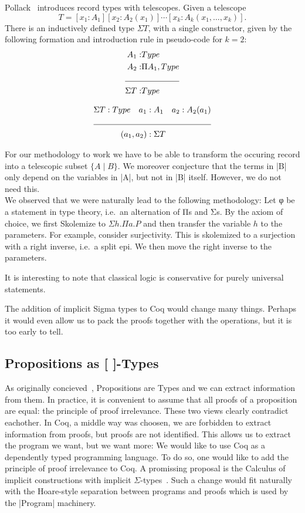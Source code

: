 \documentclass[a4paper,10pt,runningheads]{llncs}
\begin{document}
Pollack~\cite{pollack2000dependently} introduces record types with telescopes. 
Given a telescope\[
T=[x_1:A_1][x_2:A_2(x_1)]\cdots[x_k:A_k(x_1,\ldots,x_k)].
\]
There is an inductively defined type $\Sigma T$, with a single constructor, given by the following 
formation and introduction rule in pseudo-code for $k=2$:
\begin{align*}
 A_1 :& Type\\
 A_2 :& \Pi A_1,Type\\
\cline{1-2}
\Sigma T :& Type
\end{align*}

\begin{align*}
 \Sigma T:Type\quad a_1 &:A_1 \quad a_2 : A_2(a_1)\\
\cline{1-3}
(a_1,a_2) &:\Sigma T
\end{align*}

For our methodology to work we have to be able to transform the occuring record into a telescopic
subset $\{ A \mid  B\}$. We moreover conjecture that the terms in |B| only depend on the
variables in |A|, but not in |B| itself. However, we do not need this.\\

We observed that we were naturally lead to the following methodology: Let φ be a statement in type
theory, i.e.\ an alternation of Πs and Σs. By the axiom of choice, we first Skolemize to $Σ h. Πa.P$
and then transfer the variable $h$ to the parameters. For example, consider surjectivity. This is
skolemized to a surjection with a right inverse, i.e.\ a split epi. We then move the right inverse
to the parameters.

It is interesting to note that classical logic is conservative for purely universal statements.

The addition of implicit Sigma types to Coq would change many things. Perhaps it would even allow us
to pack the proofs together with the operations, but it is too early to tell.

\subsection{Propositions as [ ]-Types}
As originally concieved~\cite{ITT,CMCP}, Propositions are Types and we can extract information from
them. In practice, it is convenient to assume that all proofs of a proposition are equal: the
principle of proof irrelevance. These two views clearly contradict eachother. In Coq, a middle way
was choosen, we are forbidden to extract information from proofs, but proofs are not identified.
This allows us to extract the program we want, but we want more:
We would like to use Coq as a dependently typed programming language. To do so,
one would like to add the principle of proof irrelevance to Coq. A promissing proposal is the
Calculus of implicit constructions with implicit
$\Sigma$-types~\cite{miquel2001implicit,barras2008implicit,barrasSigma}. Such a change would fit
naturally with the Hoare-style separation between programs and proofs which is used by the |Program|
machinery. 
\end{document}
